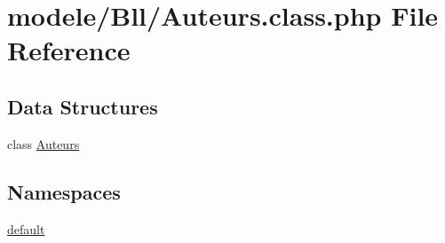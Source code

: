 \hypertarget{_auteurs_8class_8php}{}\section{modele/\+Bll/\+Auteurs.class.\+php File Reference}
\label{_auteurs_8class_8php}
\subsection*{Data Structures}
\begin{DoxyCompactItemize}
\item 
class \hyperlink{class_auteurs}{Auteurs}
\end{DoxyCompactItemize}
\subsection*{Namespaces}
\begin{DoxyCompactItemize}
\item 
 \hyperlink{namespacedefault}{default}
\end{DoxyCompactItemize}
